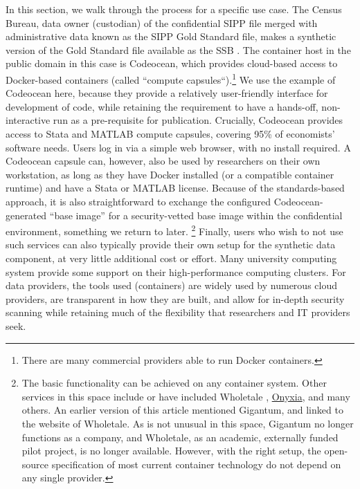 \documentclass[inline]{hdsr}
\begin{document}
In this section, we walk through the process for a specific use case. The Census Bureau, data owner (custodian) of the confidential SIPP file merged with administrative data known as the SIPP Gold Standard file, makes a synthetic version of the Gold Standard file available as the \ac{SSB} \citep{Benedettoetal_2013}. The container host in the public domain in this case is Codeocean, which provides cloud-based access to Docker-based containers (called ``compute capsules``).\footnote{There are many commercial providers able to run Docker containers.} We use the example of Codeocean here, because they provide a relatively user-friendly interface for development of code, while retaining the requirement to have a hands-off, non-interactive run as a pre-requisite for publication.  Crucially, Codeocean provides access to Stata and MATLAB compute capsules, covering 95\% of economists' software needs. Users log in via a simple web browser, with no install required. A Codeocean capsule can, however, also be used by researchers on their own workstation, as long as they have Docker installed (or a compatible container runtime) and have a Stata or MATLAB license. Because of the standards-based approach, it is also straightforward to exchange the configured Codeocean-generated ``base image'' for a security-vetted base image within the confidential environment, something we return to later.%
%
\footnote{The basic functionality can be achieved on any container system. Other services in this space include  or have included {Wholetale} \citep{brinckman_computing_2018,chard_toward_2020}, \href{https://www.onyxia.sh/}{Onyxia}, and many others. An earlier version of this article mentioned Gigantum, and linked to the website of Wholetale. As is not unusual in this space, Gigantum no longer functions as a company, and Wholetale, as an academic, externally funded pilot project, is no longer available. However, with the right setup, the open-source specification of most current container technology do not depend on any single provider.} 
%
Finally, users who wish to not use such services can also typically provide their own setup for the synthetic data component, at very little additional cost or effort. Many university computing system provide some support on their high-performance computing clusters. For data providers, the tools used (containers) are widely used by numerous cloud providers, are transparent in how they are built, and allow for in-depth security scanning while retaining much of the flexibility that researchers and IT providers seek.
\end{document}
